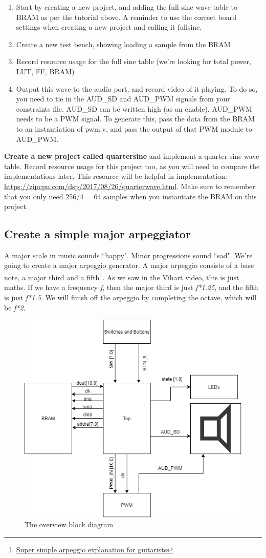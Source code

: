 \begin{enumerate}
    \item Start by creating a new project, and adding the full sine wave table to BRAM as per the tutorial above. A reminder to use the correct board settings when creating a new project and calling it fullsine.
    \item Create a new test bench, showing loading a sample from the BRAM
    \item Record resource usage for the full sine table (we're looking for total power, LUT, FF, BRAM)
    \item Output this wave to the audio port, and record video of it playing. To do so, you need to tie in the AUD\_SD and AUD\_PWM signals from your constraints file. AUD\_SD can be written high (as an enable). AUD\_PWM needs to be a PWM signal. To generate this, pass the data from the BRAM to an instantiation of pwm.v, and pass the output of that PWM module to AUD\_PWM.
\end{enumerate}
\textbf{Create a new project called quartersine} and implement a quarter sine wave table. Record resource usage for this project too, as you will need to compare the implementations later. This resource will be helpful in implementation: \href{https://zipcpu.com/dsp/2017/08/26/quarterwave.html}{https://zipcpu.com/dsp/2017/08/26/quarterwave.html}. Make sure to remember that you only need 256/4 = 64 samples when you instantiate the BRAM on this project.


\subsection{Create a simple major arpeggiator}
A major scale in music sounds ``happy". Minor progressions sound ``sad". We're going to create a major arpeggio generator.
A major arpeggio consists of a base note, a major third and a fifth\footnote{\href{https://www.superprof.com.au/blog/arpeggios-guitar-tips/}{Super simple arpeggio explanation for guitarists}}. As we saw in the Vihart video, this is just maths. If we have a frequency \textit{f}, then the major third is just \textit{f*1.25}, and the fifth is just \textit{f*1.5}. We will finish off the arpeggio by completing the octave, which will be \textit{f*2}.
\begin{figure}[H]
\centering
\includegraphics[width=0.6\columnwidth]{Figures/Prac5_BlockDiagram}
\caption{The overview block diagram}
\label{fig:prac4_block}
\end{figure}

